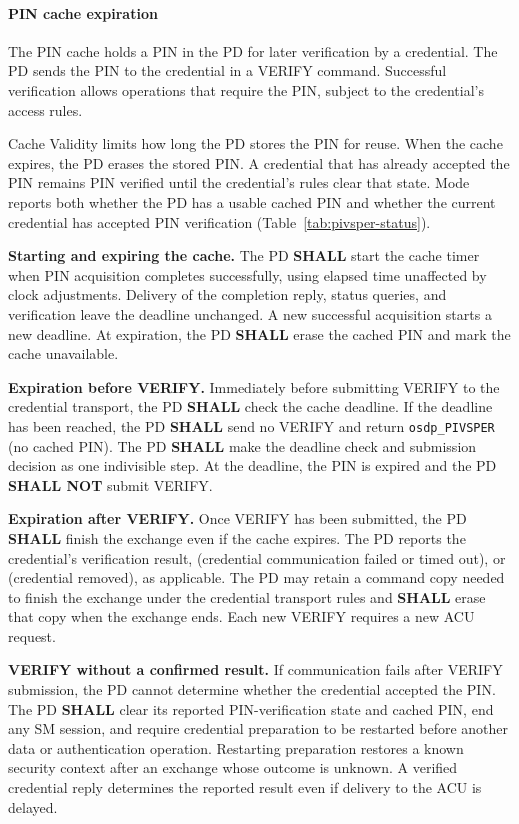\paragraph{PIN cache expiration}
\label{sec:pin-cache-expiration}
The PIN cache holds a PIN in the PD for later verification by a credential.
The PD sends the PIN to the credential in a VERIFY command. Successful
verification allows operations that require the PIN, subject to the
credential's access rules.

Cache Validity limits how long the PD stores the PIN for reuse. When the cache
expires, the PD erases the stored PIN. A credential that has already accepted
the PIN remains PIN verified until the credential's rules clear that state.
Mode  reports both whether the PD has a usable cached PIN and
whether the current credential has accepted PIN verification
(Table~\ref{tab:pivsper-status}).

\textbf{Starting and expiring the cache.}
The PD \textbf{SHALL} start the cache timer when PIN acquisition completes
successfully, using elapsed time unaffected by clock adjustments. Delivery of
the completion reply, status queries, and verification leave the deadline
unchanged. A new successful acquisition starts a new deadline. At expiration,
the PD \textbf{SHALL} erase the cached PIN and mark the cache unavailable.

\textbf{Expiration before VERIFY.}
Immediately before submitting VERIFY to the credential transport,
the PD \textbf{SHALL} check the cache deadline. If the deadline has been
reached, the PD \textbf{SHALL} send no VERIFY and return
\texttt{osdp\_PIVSPER}  (no cached PIN). The PD \textbf{SHALL}
make the deadline check and submission decision as one indivisible step.
At the deadline, the PIN is expired and the PD \textbf{SHALL NOT} submit VERIFY.

\textbf{Expiration after VERIFY.}
Once VERIFY has been submitted, the PD \textbf{SHALL} finish the exchange even
if the cache expires. The PD reports the credential's verification result,
 (credential communication failed or timed out), or
 (credential removed), as applicable.
The PD may retain a command copy needed to finish
the exchange under the credential transport rules and \textbf{SHALL} erase
that copy when the exchange ends. Each new VERIFY requires a new ACU request.

\textbf{VERIFY without a confirmed result.}
If communication fails after VERIFY submission, the PD cannot determine
whether the credential accepted the PIN. The PD \textbf{SHALL} clear its
reported PIN-verification state and cached PIN, end any SM session, and require
credential preparation to be restarted before another data or authentication
operation. Restarting preparation restores a known security context after an
exchange whose outcome is unknown. A verified credential reply determines the reported result even if delivery
to the ACU is delayed.

